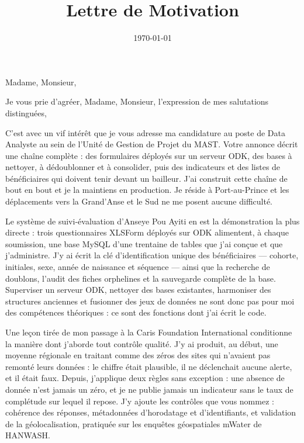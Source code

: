 \documentclass[10pt,a4paper,sans]{moderncv}
\title{Lettre de Motivation}
\begin{document}
\date{\today}
\opening{Madame, Monsieur,}
\closing{Je vous prie d'agréer, Madame, Monsieur, l'expression de mes salutations distinguées,}

\makelettertitle

C'est avec un vif intérêt que je vous adresse ma candidature au poste de Data Analyste au sein de l'Unité de Gestion de Projet du MAST. Votre annonce décrit une chaîne complète : des formulaires déployés sur un serveur ODK, des bases à nettoyer, à dédoublonner et à consolider, puis des indicateurs et des listes de bénéficiaires qui doivent tenir devant un bailleur. J'ai construit cette chaîne de bout en bout et je la maintiens en production. Je réside à Port-au-Prince et les déplacements vers la Grand'Anse et le Sud ne me posent aucune difficulté.

Le système de suivi-évaluation d'Anseye Pou Ayiti en est la démonstration la plus directe : trois questionnaires XLSForm déployés sur ODK alimentent, à chaque soumission, une base MySQL d'une trentaine de tables que j'ai conçue et que j'administre. J'y ai écrit la clé d'identification unique des bénéficiaires --- cohorte, initiales, sexe, année de naissance et séquence --- ainsi que la recherche de doublons, l'audit des fiches orphelines et la sauvegarde complète de la base. Superviser un serveur ODK, nettoyer des bases existantes, harmoniser des structures anciennes et fusionner des jeux de données ne sont donc pas pour moi des compétences théoriques : ce sont des fonctions dont j'ai écrit le code.

Une leçon tirée de mon passage à la Caris Foundation International conditionne la manière dont j'aborde tout contrôle qualité. J'y ai produit, au début, une moyenne régionale en traitant comme des zéros des sites qui n'avaient pas remonté leurs données : le chiffre était plausible, il ne déclenchait aucune alerte, et il était faux. Depuis, j'applique deux règles sans exception : une absence de donnée n'est jamais un zéro, et je ne publie jamais un indicateur sans le taux de complétude sur lequel il repose. J'y ajoute les contrôles que vous nommez : cohérence des réponses, métadonnées d'horodatage et d'identifiants, et validation de la géolocalisation, pratiquée sur les enquêtes géospatiales mWater de HANWASH.
\end{document}
